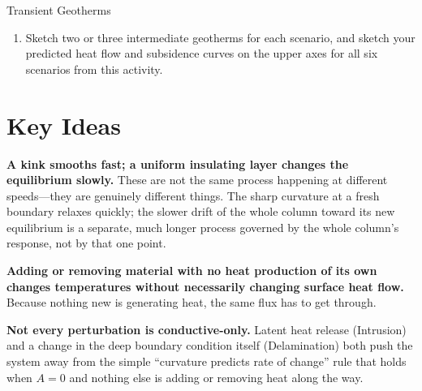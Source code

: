 \begin{activity}{Transient Geotherms}
\begin{questions}[resume]
\begin{enumerate}[label=(\alph*)]
    \item Sketch two or three intermediate geotherms for each scenario, and sketch your predicted heat flow and subsidence curves on the upper axes for all six scenarios from this activity.
    \answerbox[2.5cm]
  \end{enumerate}
\end{questions}

\section*{Key Ideas}

\textbf{A kink smooths fast; a uniform insulating layer changes the equilibrium slowly.} These are not the same process happening at different speeds---they are genuinely different things. The sharp curvature at a fresh boundary relaxes quickly; the slower drift of the whole column toward its new equilibrium is a separate, much longer process governed by the whole column's response, not by that one point.

\textbf{Adding or removing material with no heat production of its own changes temperatures without necessarily changing surface heat flow.} Because nothing new is generating heat, the same flux has to get through. 

\textbf{Not every perturbation is conductive-only.} Latent heat release (Intrusion) and a change in the deep boundary condition itself (Delamination) both push the system away from the simple ``curvature predicts rate of change'' rule that holds when $A=0$ and nothing else is adding or removing heat along the way.

\end{activity}